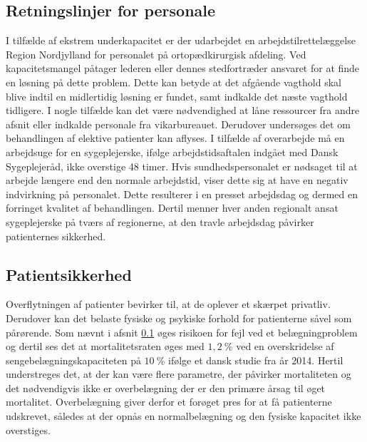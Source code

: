 \subsection{Retningslinjer for personale} \label{Per_sik}
I tilfælde af ekstrem underkapacitet er der udarbejdet en arbejdstilrettelæggelse Region Nordjylland for personalet på ortopædkirurgisk afdeling. Ved kapacitetsmangel påtager lederen eller dennes stedfortræder ansvaret for at finde en løsning på dette problem. Dette kan betyde at det afgående vagthold skal blive indtil en midlertidig løsning er fundet, samt indkalde det næste vagthold tidligere. I nogle tilfælde kan det være nødvendighed at låne ressourcer fra andre afsnit eller indkalde personale fra vikarbureauet. Derudover undersøges det om behandlingen af elektive patienter kan aflyses.\cite{Bjerg2016} I tilfælde af overarbejde må en arbejdsuge for en sygeplejerske, ifølge arbejdstidsaftalen indgået med Dansk Sygeplejeråd, ikke overstige 48 timer\cite{Danske2015}.   Hvis sundhedspersonalet er nødsaget til at arbejde længere end den normale arbejdstid, viser dette sig at have en negativ indvirkning på personalet.\cite{Dinges2004} Dette resulterer i en presset arbejdsdag og dermed en forringet kvalitet af behandlingen. Dertil menner hver anden regionalt ansat sygeplejerske på tværs af regionerne, at den travle arbejdsdag påvirker patienternes sikkerhed.\cite{Kjeldsen2015} 

\subsection{Patientsikkerhed}
Overflytningen af patienter bevirker til, at de oplever et skærpet privatliv. \cite{Madsen2014} Derudover kan det belaste fysiske og psykiske forhold for patienterne såvel som pårørende. \cite{Heidmann2014} Som nævnt i afsnit \ref{Per_sik} øges risikoen for fejl ved et belægningproblem og dertil ses det at mortalitetsraten øges med $1,2~\%$ ved en overskridelse af sengebelægningskapaciteten på $10~\%$ ifølge et dansk studie fra år 2014. \cite{Madsen2014} Hertil understreges det, at der kan være flere parametre, der påvirker mortaliteten og det nødvendigvis ikke er overbelægning der er den primære årsag til øget mortalitet. Overbelægning giver derfor et forøget pres for at få patienterne udskrevet, således at der opnås en normalbelægning og  den fysiske kapacitet ikke overstiges.  


